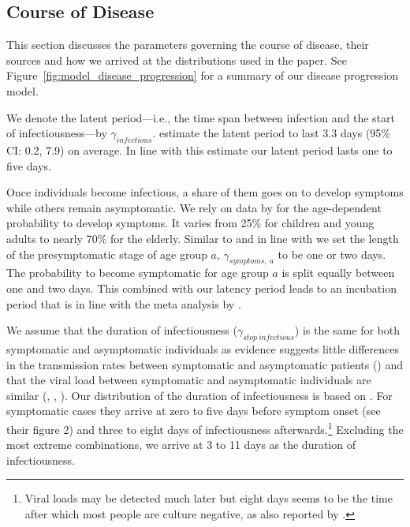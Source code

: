 \subsection{Course of Disease}
\label{sub:data_course_of_disease}

This section discusses the parameters governing the course of disease, their sources and
how we arrived at the distributions used in the paper.
See Figure~\ref{fig:model_disease_progression} for a summary of our
disease progression model.



We denote the latent period---i.e., the time span between infection and the start of
infectiousness---by $\gamma_{infectious}$. \cite{Zhao2021} estimate the latent period to
last 3.3 days (95\% CI: 0.2, 7.9) on average. In line with this estimate our latent
period lasts one to five days.

Once individuals become infectious, a share of them goes on to develop symptoms while
others remain asymptomatic. We rely on data by \cite{Davies2020} for the age-dependent
probability to develop symptoms. It varies from 25\% for children and young adults to
nearly 70\% for the elderly.
Similar to \citet{Peak2020} and in line with \citet{He2020} we set the length of the
presymptomatic stage of age group $a$, $\gamma_{symptoms,\:a}$ to be one or two days. The
probability to become symptomatic for age group $a$ is split equally between one and two
days. This combined with our latency period leads to an incubation period that is in line
with the meta analysis by \citet{McAloon2020}.


We assume that the duration of infectiousness ($\gamma_{stop\:infectious}$) is the same
for both symptomatic and asymptomatic individuals as evidence suggests little differences
in the transmission rates between symptomatic and asymptomatic patients (\citet{Yin2020})
and that the viral load between symptomatic and asymptomatic individuals are similar
(\citet{Zou2020}, \citet{Byrne2020}, \citet{Singanayagam2020}). Our distribution of the
duration of infectiousness is based on \citet{Byrne2020}. For symptomatic cases they
arrive at zero to five days before symptom onset (see their figure 2) and three to eight
days of infectiousness afterwards.\footnote{Viral loads may be detected much later but
eight days seems to be the time after which most people are culture negative, as also
reported by \citet{Singanayagam2020}.} Excluding the most extreme combinations, we arrive
at 3 to 11 days as the duration of infectiousness.

